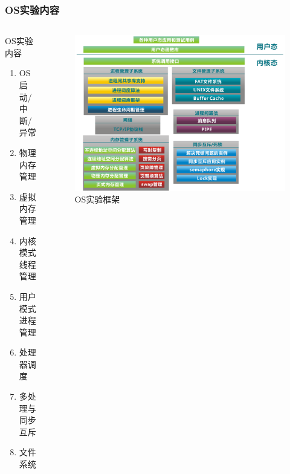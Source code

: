\documentclass[UTF8]{ctexbeamer}
\begin{document}
\begin{frame}
	
	\frametitle{OS实验内容}

	\begin{columns}
    \begin{column}{.35\linewidth}
    OS实验内容
	\begin{enumerate}
	    \item OS启动/中断/异常
		\item 物理内存管理
		\item 虚拟内存管理	
		\item 内核模式线程管理
		\item 用户模式进程管理
		\item 处理器调度
		\item 多处理与同步互斥
		\item 文件系统
	\end{enumerate}
	\end{column}
	
	\begin{column}{.7\linewidth}
	\begin{figure}
		\centering
		\includegraphics[width=1.0\linewidth]{oslab-overview}
		\caption{OS实验框架}
	\end{figure}
	\end{column}
	\end{columns}
\end{frame}
\end{document}
